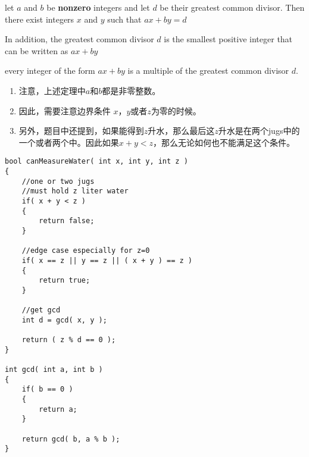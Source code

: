 let $ a $ and $ b $ be \textbf{nonzero} integers and let $ d $ be their greatest common divisor. Then there exist integers $ x $ and $ y $ such that $ ax+by=d $

In addition, the greatest common divisor $ d $ is the smallest positive integer that can be written as $ ax + by $

every integer of the form $ ax + by $ is a multiple of the greatest common divisor $ d $.
\begin{enumerate}
\item 注意，上述定理中$ a $和$ b $都是非零整数。
\item 因此，需要注意边界条件 $ x $，$ y $或者$ z $为零的时候。
\item 另外，题目中还提到，如果能得到$z$升水，那么最后这$z$升水是在两个jugs中的一个或者两个中。因此如果$x+y<z$，那么无论如何也不能满足这个条件。
\end{enumerate}

\setcounter{lstlisting}{0}
\begin{lstlisting}[style=customc, caption={GCD}]
bool canMeasureWater( int x, int y, int z )
{
    //one or two jugs
    //must hold z liter water
    if( x + y < z )
    {
        return false;
    }

    //edge case especially for z=0
    if( x == z || y == z || ( x + y ) == z )
    {
        return true;
    }

    //get gcd
    int d = gcd( x, y );

    return ( z % d == 0 );
}

int gcd( int a, int b )
{
    if( b == 0 )
    {
        return a;
    }

    return gcd( b, a % b );
}
\end{lstlisting}

